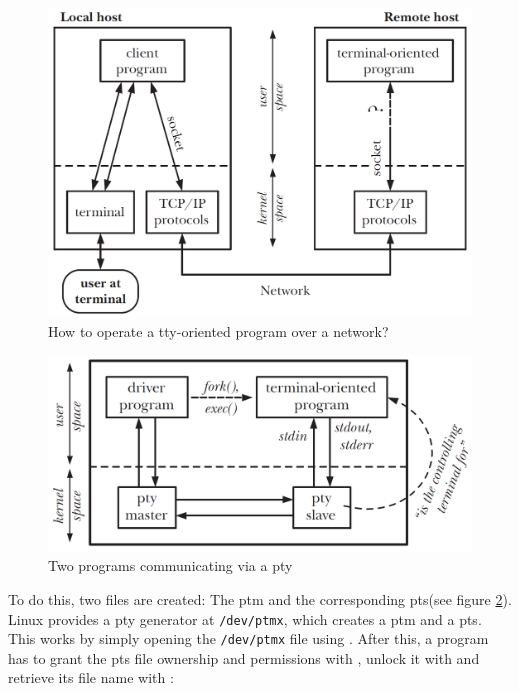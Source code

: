 \documentclass[10pt,a4paper,titlepage,twoside,english,final]{zhawreprt}
\begin{document}
\begin{figure}[ht]
\includegraphics[width=\textwidth]{PseudoterminalProblem}
\caption{How to operate a \gls{tty}-oriented program over a network? \citep[p.1376]{KerriskTLPI}}
\label{fig:HowToOperateTtyOrientedProgramOverNetwork}
\end{figure}

\begin{figure}[ht]
\includegraphics[width=\textwidth]{Pseudoterminal}
\caption{Two programs communicating via a \gls{pty} \citep[p.1377]{KerriskTLPI}}
\label{fig:TwoProgramsCommunicatingViaAPty}
\end{figure}

To do this, two files are created:
The \gls{ptm} and the corresponding \gls{pts}(see figure \ref{fig:TwoProgramsCommunicatingViaAPty}).
\gls{Linux} provides a \gls{pty} generator at \texttt{/dev/ptmx}, which creates a \gls{ptm} and a \gls{pts}.
This works by simply opening the \texttt{/dev/ptmx} file using \cite{posix_openpt}.
After this, a program has to grant the \gls{pts} file ownership and permissions with \cite{grantpt}, unlock it with \cite{unlockpt} and retrieve its file name with \cite{ptsname}:
\end{document}
